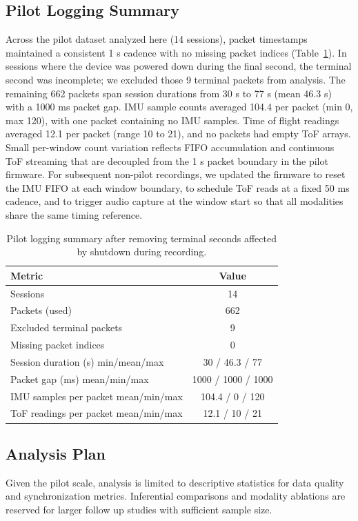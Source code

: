 \documentclass[manuscript,review,anonymous]{acmart}
\begin{document}
\subsection{Pilot Logging Summary}
Across the pilot dataset analyzed here (14 sessions), packet timestamps maintained a consistent 1 s cadence with no missing packet indices (Table~\ref{tab:pilot_summary}). In sessions where the device was powered down during the final second, the terminal second was incomplete; we excluded those 9 terminal packets from analysis. The remaining 662 packets span session durations from 30 s to 77 s (mean 46.3 s) with a 1000 ms packet gap. IMU sample counts averaged 104.4 per packet (min 0, max 120), with one packet containing no IMU samples. Time of flight readings averaged 12.1 per packet (range 10 to 21), and no packets had empty ToF arrays.
Small per-window count variation reflects FIFO accumulation and continuous ToF streaming that are decoupled from the 1 s packet boundary in the pilot firmware. For subsequent non-pilot recordings, we updated the firmware to reset the IMU FIFO at each window boundary, to schedule ToF reads at a fixed 50 ms cadence, and to trigger audio capture at the window start so that all modalities share the same timing reference.

\begin{table}[t]
  \centering
  \caption{Pilot logging summary after removing terminal seconds affected by shutdown during recording.}
  \label{tab:pilot_summary}
  \begin{tabular}{p{}c}
    \textbf{Metric} & \textbf{Value} \\
    \hline
    Sessions & 14 \\
    Packets (used) & 662 \\
    Excluded terminal packets & 9 \\
    Missing packet indices & 0 \\
    Session duration (s) min/mean/max & 30 / 46.3 / 77 \\
    Packet gap (ms) mean/min/max & 1000 / 1000 / 1000 \\
    IMU samples per packet mean/min/max & 104.4 / 0 / 120 \\
    ToF readings per packet mean/min/max & 12.1 / 10 / 21 \\
  \end{tabular}
\end{table}

\subsection{Analysis Plan}
Given the pilot scale, analysis is limited to descriptive statistics for data quality and synchronization metrics. Inferential comparisons and modality ablations are reserved for larger follow up studies with sufficient sample size.
\end{document}
